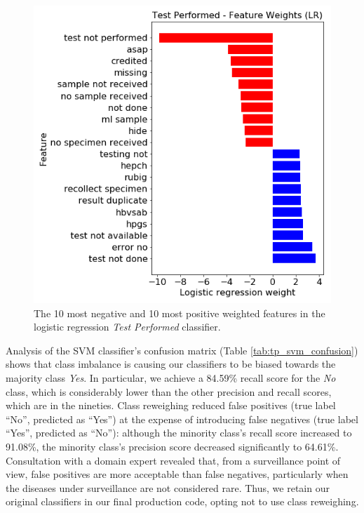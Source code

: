 \documentclass[sigconf]{acmart}
\begin{document}
\begin{figure}
    \centering
    \includegraphics[width=\linewidth]{tp_lr_features.png}
    \caption{The 10 most negative and 10 most positive weighted features in the logistic regression \textit{Test Performed} classifier.}
    \label{fig:tp_lr_features}
\end{figure}

Analysis of the SVM classifier's confusion matrix (Table \ref{tab:tp_svm_confusion}) shows that class imbalance is causing our classifiers to be biased towards the majority class \textit{Yes}. In particular, we achieve a 84.59\% recall score for the \textit{No} class, which is considerably lower than the other precision and recall scores, which are in the nineties. Class reweighing reduced false positives (true label ``No'', predicted as ``Yes'') at the expense of introducing false negatives (true label ``Yes'', predicted as ``No''): although the minority class's recall score increased to 91.08\%, the minority class's precision score decreased significantly to 64.61\%. Consultation with a domain expert revealed that, from a surveillance point of view, false positives are more acceptable than false negatives, particularly when the diseases under surveillance are not considered rare. Thus, we retain our original classifiers in our final production code, opting not to use class reweighing.
\end{document}
